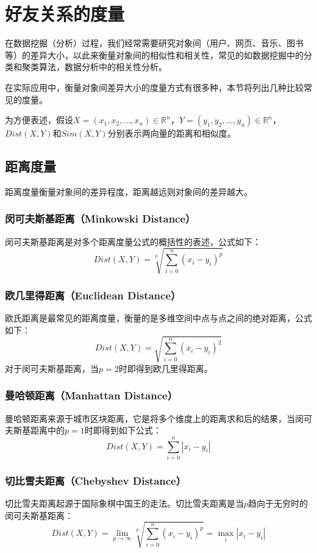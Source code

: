 \section{好友关系的度量}
在数据挖掘（分析）过程，我们经常需要研究对象间（用户、网页、音乐、图书等）的差异大小，以此来衡量对象间的相似性和相关性，常见的如数据挖掘中的分类和聚类算法，数据分析中的相关性分析。

在实际应用中，衡量对象间差异大小的度量方式有很多种，本节将列出几种比较常见的度量。

为方便表述，假设$X=(x_1,x_2,\ldots,x_n)\in \mathbb{R}^n$，$Y=(y_1,y_2,\ldots,y_n)\in \mathbb{R}^n$，$Dist(X,Y)$和$Sim(X,Y)$分别表示两向量的距离和相似度。

\subsection{距离度量}
距离度量衡量对象间的差异程度，距离越远则对象间的差异越大。

\subsubsection{闵可夫斯基距离（Minkowski Distance）}
闵可夫斯基距离是对多个距离度量公式的概括性的表述，公式如下：
\begin{equation}\label{eq:minkowski}
Dist(X,Y)=\sqrt[p]{\sum_{i=0}^{n}{(x_i-y_i)^p}}
\end{equation}

\subsubsection{欧几里得距离（Euclidean Distance）}
欧氏距离是最常见的距离度量，衡量的是多维空间中点与点之间的绝对距离，公式如下：
\begin{equation}\label{eq:euclidean}
Dist(X,Y)=\sqrt{\sum_{i=0}^{n}{(x_i-y_i)^2}}
\end{equation}
对于闵可夫斯基距离，当$p=2$时即得到欧几里得距离。

\subsubsection{曼哈顿距离（Manhattan Distance）}
曼哈顿距离来源于城市区块距离，它是将多个维度上的距离求和后的结果，当闵可夫斯基距离中的$p=1$时即得到如下公式：
\begin{equation}\label{eq:manhattan}
Dist(X,Y)=\sum_{i=0}^{n}{|x_i-y_i|}
\end{equation}

\subsubsection{切比雪夫距离（Chebyshev Distance）}
切比雪夫距离起源于国际象棋中国王的走法。切比雪夫距离是当$p$趋向于无穷时的闵可夫斯基距离：
\begin{equation}\label{eq:chebyshev}
Dist(X,Y)=\lim_{p \rightarrow \infty}{\sqrt[p]{\sum_{i=0}^{n}{(x_i-y_i)^p}}}=\max_{i}{|x_i-y_i|}
\end{equation}

